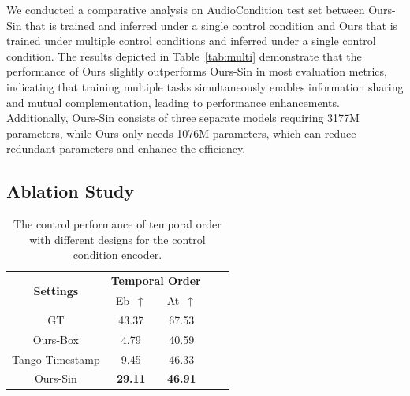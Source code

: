 \documentclass[letterpaper]{article}
\begin{document}
We conducted a comparative analysis on AudioCondition test set between Ours-Sin that is trained and inferred under a single control condition and Ours that is trained under multiple control conditions and inferred under a single control condition. The results depicted in Table~\ref{tab:multi} demonstrate that the performance of Ours slightly outperforms
Ours-Sin in most evaluation metrics, indicating that training multiple tasks simultaneously enables information sharing and mutual complementation, leading to performance enhancements. Additionally, Ours-Sin consists of three separate models requiring 3177M parameters, while Ours only needs 1076M parameters, which can reduce redundant parameters and enhance the efficiency.

\subsection{Ablation Study}

\begin{table}[!h]\footnotesize
    \centering
    \caption{The control performance of temporal order with different designs for the control condition encoder.}
    \label{tab:ablation control condition encoder}
        \begin{tabular}{c|cccc}
        \toprule
        \multirow{2}{*}{\textbf{Settings}} & \multicolumn{2}{c}{\textbf{Temporal Order}} \\
         & Eb~$\uparrow$ & At~$\uparrow$  \\
        \midrule
        \midrule
         GT & 43.37 & 67.53\\
         \midrule
         Ours-Box & 4.79 & 40.59 \\
         Tango-Timestamp & 9.45 & 46.33 \\
         Ours-Sin & \textbf{29.11} & \textbf{46.91} \\
        \bottomrule
        \end{tabular}
\end{table}
\end{document}
